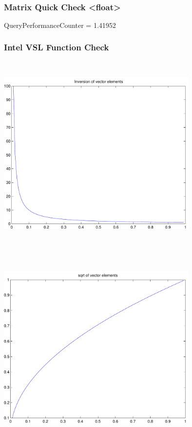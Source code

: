 \documentclass[9pt]{article}
\theoremstyle{plain}
\theoremstyle{definition}
\theoremstyle{remark}
\numberwithin{equation}{section}
\begin{document}
\subsubsection{Matrix Quick Check <float>}
QueryPerformanceCounter  =  1.41952
\subsubsection{Intel VSL Function Check}
\includegraphics[width=10.0cm,height=10.0cm]{klVSLInv.pdf}

\includegraphics[width=10.0cm,height=10.0cm]{klVSLSqrt.pdf}
\end{document}
